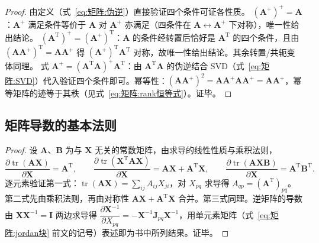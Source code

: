 \begin{proof}
由定义（式~\eqref{eq:矩阵:伪逆}）直接验证四个条件可证各性质。
$(\boldsymbol{A}^{+})^{+} = \boldsymbol{A}$：$\boldsymbol{A}^{+}$ 满足条件等价于 $\boldsymbol{A}$ 对 $\boldsymbol{A}^{+}$ 亦满足（四条件在 $\boldsymbol{A}\leftrightarrow\boldsymbol{A}^{+}$ 下对称），唯一性给出结论。
$(\boldsymbol{A}^{\mathrm{T}})^{+} = (\boldsymbol{A}^{+})^{\mathrm{T}}$：$\boldsymbol{A}$ 的条件经转置后恰好是 $\boldsymbol{A}^{\mathrm{T}}$ 的四个条件，且由 $(\boldsymbol{A}\boldsymbol{A}^{+})^{\mathrm{T}} = \boldsymbol{A}\boldsymbol{A}^{+}$ 得 $(\boldsymbol{A}^{+})^{\mathrm{T}}\boldsymbol{A}^{\mathrm{T}}$ 对称，故唯一性给出结论。其余转置/共轭变体同理。
式 $\boldsymbol{A}^{+} = (\boldsymbol{A}^{\mathrm{T}}\boldsymbol{A})^{+}\boldsymbol{A}^{\mathrm{T}}$：由 $\boldsymbol{A}^{\mathrm{T}}\boldsymbol{A}$ 的伪逆结合 SVD（式~\eqref{eq:矩阵:SVD}）代入验证四个条件即可。幂等性：$(\boldsymbol{A}\boldsymbol{A}^{+})^{2} = \boldsymbol{A}\boldsymbol{A}^{+}\boldsymbol{A}\boldsymbol{A}^{+} = \boldsymbol{A}\boldsymbol{A}^{+}$，幂等矩阵的迹等于其秩（见式~\eqref{eq:矩阵:rank恒等式}）。证毕。
\end{proof}

\subsection*{矩阵导数的基本法则}

\begin{proof}
设 $\boldsymbol{A}$、$\boldsymbol{B}$ 为与 $\boldsymbol{X}$ 无关的常数矩阵，由求导的线性性质与乘积法则，
\[
\frac{\partial\operatorname{tr}(\boldsymbol{A}\boldsymbol{X})}{\partial\boldsymbol{X}} = \boldsymbol{A}^{\mathrm{T}}, \qquad
\frac{\partial\operatorname{tr}(\boldsymbol{X}^{\mathrm{T}}\boldsymbol{A}\boldsymbol{X})}{\partial\boldsymbol{X}} = \boldsymbol{A}\boldsymbol{X}+\boldsymbol{A}^{\mathrm{T}}\boldsymbol{X}, \qquad
\frac{\partial\operatorname{tr}(\boldsymbol{A}\boldsymbol{X}\boldsymbol{B})}{\partial\boldsymbol{X}} = \boldsymbol{A}^{\mathrm{T}}\boldsymbol{B}^{\mathrm{T}}.
\]
逐元素验证第一式：$\operatorname{tr}(\boldsymbol{A}\boldsymbol{X}) = \sum_{ij}A_{ij}X_{ji}$，对 $X_{pq}$ 求导得 $A_{qp} = (\boldsymbol{A}^{\mathrm{T}})_{pq}$。第二式先由乘积法则，再由对称性 $\boldsymbol{A}\boldsymbol{X}+\boldsymbol{A}^{\mathrm{T}}\boldsymbol{X}$ 合并。第三式同理。逆矩阵的导数由 $\boldsymbol{X}\boldsymbol{X}^{-1} = \boldsymbol{I}$ 两边求导得 $\dfrac{\partial\boldsymbol{X}^{-1}}{\partial X_{pq}} = -\boldsymbol{X}^{-1}\boldsymbol{J}_{pq}\boldsymbol{X}^{-1}$，用单元素矩阵（式~\eqref{eq:矩阵:jordan块} 前文的记号）表述即为书中所列结果。证毕。
\end{proof}

